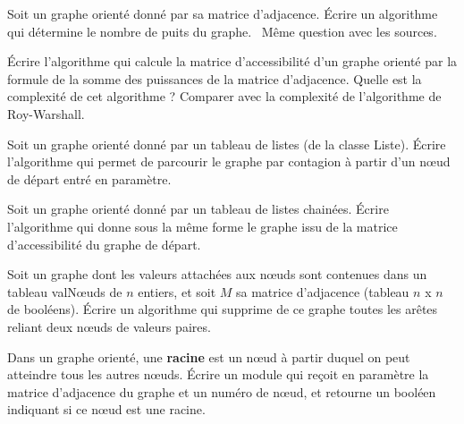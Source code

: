 	\begin{Exercice}{}
		Soit un graphe orienté donné par sa matrice d'adjacence. 
		Écrire un algorithme qui détermine le nombre de puits du
		graphe. \ Même question avec les sources.

	\end{Exercice}
	
	\begin{Exercice}{}
		Écrire l'algorithme qui calcule la matrice d'accessibilité 
		d'un graphe orienté par la formule de la somme des puissances
		de la matrice d'adjacence. 
		Quelle est la complexité de cet algorithme ? 
		Comparer avec la complexité de l'algorithme de Roy-Warshall.

	\end{Exercice}
	
	\begin{Exercice}{}
		Soit un graphe orienté donné par un tableau de listes (de la classe Liste). 
		Écrire l'algorithme qui permet de parcourir le graphe par contagion 
		à partir d'un n{\oe}ud de départ entré en paramètre. 

	\end{Exercice}
	
	\begin{Exercice}{}
		Soit un graphe orienté donné par un tableau de listes chainées. 
		Écrire l'algorithme qui donne sous la même forme le
		graphe issu de la matrice d'accessibilité du graphe de départ.
		
	\end{Exercice}
	
	\begin{Exercice}{}
		Soit un graphe dont les valeurs attachées aux n{\oe}uds 
		sont contenues dans un tableau valN{\oe}uds de $n$ entiers, 
		et soit $M$ sa matrice d'adjacence (tableau $n$ \textsf{x} $n$ 
		de booléens). Écrire un algorithme qui supprime de ce graphe 
		toutes les arêtes reliant deux n{\oe}uds de valeurs paires.
		
	\end{Exercice}
	
	\begin{Exercice}{}
		Dans un graphe orienté, une \textbf{racine} est un n{\oe}ud 
		à partir duquel on peut atteindre tous les autres n{\oe}uds.
		Écrire un module qui reçoit en paramètre la matrice d'adjacence 
		du graphe et un numéro de n{\oe}ud, et retourne un
		booléen indiquant si ce n{\oe}ud est une racine.

	\end{Exercice}
	
